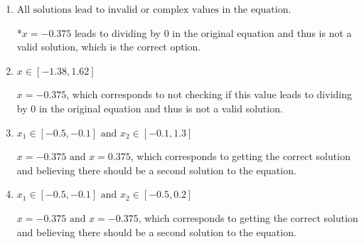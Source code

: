 \documentclass{extbook}[14pt]
\begin{document}
\begin{enumerate}
{\begin{enumerate}[label=\Alph*.]
$x = 0.375$, which corresponds to not distributing the factor $48x + 18$ correctly when trying to eliminate the fraction.
\item \( \text{All solutions lead to invalid or complex values in the equation.} \)

*$x = -0.375$ leads to dividing by 0 in the original equation and thus is not a valid solution, which is the correct option.
\item \( x \in [-1.38,1.62] \)

$x = -0.375$, which corresponds to not checking if this value leads to dividing by 0 in the original equation and thus is not a valid solution.
\item \( x_1 \in [-0.5, -0.1] \text{ and } x_2 \in [-0.1,1.3] \)

$x = -0.375 \text{ and } x = 0.375$, which corresponds to getting the correct solution and believing there should be a second solution to the equation.
\item \( x_1 \in [-0.5, -0.1] \text{ and } x_2 \in [-0.5,0.2] \)

$x = -0.375 \text{ and } x = -0.375$, which corresponds to getting the correct solution and believing there should be a second solution to the equation.
\end{enumerate}

}
\end{enumerate}
\end{document}
